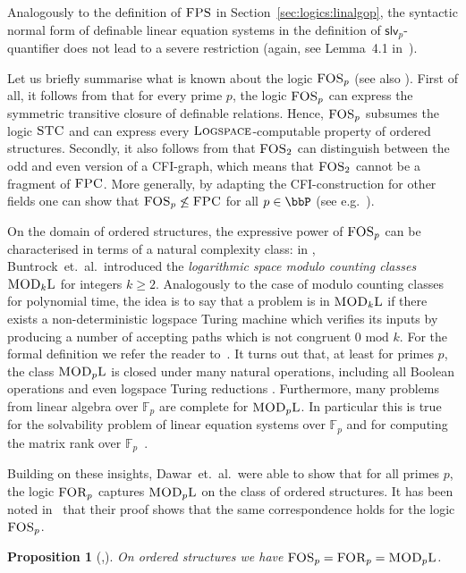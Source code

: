 \documentclass[a4paper,UKenglish]{lipics}
\newcommand{\modulo}{\ensuremath{\text{mod }}}
\newcommand{\field}[1]{\mathbb{#1}}
\newcommand{\logic}[1]{\ensuremath{\textsc{#1}}\xspace}
\newcommand{\STC}{\logic{STC}}
\newcommand{\FPC}{\logic{FPC}}
\newcommand{\FOSp}{\ensuremath{\logic{FOS}_p}\xspace}
\newcommand{\FOSx}[1]{\ensuremath{\logic{FOS}_{#1}}\xspace}
\newcommand{\FPS}{\ensuremath{\logic{FPS}}\xspace}
\newcommand{\FORx}[1]{\ensuremath{\logic{FOR}_{#1}}\xspace}
\newcommand{\slvp}{\ensuremath{\textsf{slv}_p}\xspace}
\newcommand{\MODLx}[1]{\ensuremath{\textsc{MOD}_{#1}\textsc{L}}\xspace}
\newcommand{\complexityclass}[1]{\ensuremath{\textsc{#1}}\xspace}
\newcommand{\LOGSPACE}{\complexityclass{Logspace}}
\theoremstyle{plain}
\newtheorem{prop}[theorem]{Proposition}
\begin{document}
Analogously to the definition of $\FPS$ in Section~\ref{sec:logics:linalgop}, 
the syntactic normal form of definable linear equation systems in the 
definition of $\slvp$-quantifier does not lead to a severe restriction (again, 
see Lemma~4.1 in~\cite{DaGrHoKoPa13}).

\medskip
Let us briefly summarise what is known about the logic $\FOSp$ (see
also \cite{DaGrHoKoPa13,Pa10}). First of all, it follows from \cite{DaGrHoLa09} 
that for
every prime $p$, the logic 
$\FOSp$ can express the symmetric transitive closure of definable 
relations. Hence, $\FOSp$ subsumes the logic $\STC$ and can express every 
\LOGSPACE-computable property of ordered structures. Secondly, it also follows
from \cite{DaGrHoLa09} that $\FOSx{2}$ can distinguish between the odd and even
version of a CFI-graph, which means that $\FOSx{2}$ cannot be a fragment of
$\FPC$. More generally, by adapting the CFI-construction for other fields
one can show that $\FOSx{p} \not\leq \FPC$ for all $p\in \bbP$ (see
e.g.\ \cite{Ho10}).

On the domain of ordered structures, the expressive power 
of $\FOSp$ can be characterised in terms of a natural complexity 
class: in \cite{BuHeDaMe91}, Buntrock~et.~al.\ introduced
the \emph{logarithmic space modulo counting classes} $\MODLx{k}$ for integers
$k\geq 2$. Analogously to the case of modulo counting classes for polynomial
time, the idea is to say that a problem is in $\MODLx{k}$ if there exists a
non-deterministic logspace Turing machine which verifies its inputs by producing
a number of accepting paths which is not congruent $0 \,\,\modulo k$. For the 
formal
definition we refer the reader to~\cite{BuHeDaMe91}. It turns out that, at least
for primes $p$, the class $\MODLx{p}$ is closed under many natural operations,
including all Boolean operations and even logspace Turing reductions
\cite{BuHeDaMe91,HeReVo00}. Furthermore, many problems from linear
algebra over $\field F_p$ are complete for $\MODLx{p}$. In particular this is
true for the solvability problem of linear equation systems over $\field F_p$
and for computing the matrix rank over $\field F_p$~\cite{BuHeDaMe91}.

Building on these insights, Dawar~et.~al.\ were able to show that for all
primes $p$, the logic $\FORx{p}$ captures $\MODLx{p}$ on the class of ordered
structures. It has been noted in~\cite{Pa10} that their proof shows that 
the same correspondence holds for the logic $\FOSx{p}$.
\begin{prop}[\cite{DaGrHoLa09},\cite{Pa10}]
 On ordered structures we have $ \FOSx{p} = \FORx{p} = \MODLx{p}$.
\end{prop}
\end{document}
